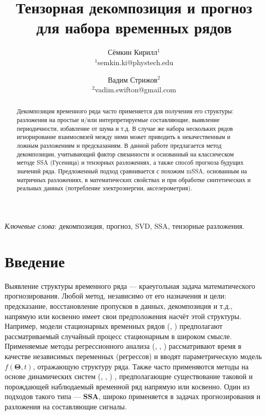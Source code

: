 
\usepackage[backend=biber]{biblatex}



\makeatletter
\let\@fnsymbol\@arabic
\makeatother


\title{Тензорная декомпозиция и прогноз для набора временных рядов}
\author{Сёмкин Кирилл$^{1}$ \\ {\footnotesize $^{1}$semkin.ki@phystech.edu} \and Вадим Стрижов$^{2}$ \\ {\footnotesize $^{2}$vadim.swifton@gmail.com}}
\date{}



	
	\maketitle
	
	\begin{abstract}
		
		Декомпозиция временного ряда часто применяется для получения его структуры: разложения на простые и/или интерпретируемые составляющие, выявление периодичности, избавление от шума и т.д. В случае же набора нескольких рядов игнорирование взаимосвязей между ними может приводить к некачественным и ложным разложениям и предсказаниям. В данной работе предлагается метод декомпозиции, учитывающий фактор связанности и основанный на классическом методе SSA (Гусеница) и тензорных разложениях, а также способ прогноза будущих значений ряда. Предложенный подход сравнивается с похожим mSSA, основанным на матричных разложениях, в математических свойствах и при обработке синтетических и реальных данных (потребление электроэнергии, акселерометрия).
		
	\end{abstract}
	
	\textit{Ключевые слова}: {\small декомпозиция, прогноз, SVD, SSA, тензорные разложения}.
	
	
	\section*{Введение}\label{Intro}
	
		Выявление структуры временного ряда --- краеугольная задача математического прогнозирования. Любой метод, независимо от его назначения и цели: предсказание, восстановление пропусков в данных, декомпозиция и т.д., напрямую или косвенно имеет свои предположения насчёт этой структуры. Например, модели стационарных временных рядов (\cite{Box_Jenkins_methodology}, \cite{hamilton1994time}) предполагают рассматриваемый случайный процесс стационарным в широком смысле. Применяемые методы регрессионного анализа (\cite{3b1355aedd1041f1853e609a410576f3}, \cite{Greene2003Econometric}, \cite{enders2010applied})  рассматривают время в качестве независимых переменных (регрессов) и вводят параметрическую модель $ f(\mathbf{\Theta}, t) $, отражающую структуру ряда. Также часто применяются методы на основе динамических систем (\cite{ecfb9dc578be43ae9ee8fc88b8ff9151}, \cite{chen2018neural}, \cite{Tsonis2018}) , предполагающие существование таковой и порождающей наблюдаемый временной ряд напрямую или косвенно. Один из подходов такого типа --- \textbf{SSA}, широко применяется в задачах прогнозирования и разложения на составляющие сигналы.
		
